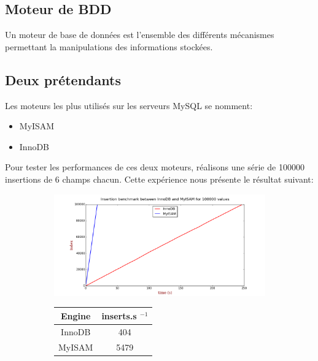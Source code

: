 \subsection*{Moteur de BDD}
Un moteur de base de données est l'ensemble des différents mécanismes permettant la manipulations des informations stockées. 

\subsection*{Deux prétendants}

Les moteurs les plus utilisés sur les serveurs MySQL se nomment:

\begin{itemize}
	\item{MyISAM} 
	\item{InnoDB} 
\end{itemize}

Pour tester les performances de ces deux moteurs, réalisons une série de 100000 insertions de 6 champs chacun. Cette expérience nous présente le résultat suivant:
  
\begin{figure}[h]
	\centering
	\begin{subfigure}[b]{0.6\textwidth}
		\includegraphics[width=\textwidth]{images/benchmark_inno_isam_100000.png}
	\end{subfigure}
	\begin{subfigure}[b]{0.3\textwidth}
		\begin{tabular}{|c|c|}
		\hline Engine & inserts.s $^{-1}$ \\ 
		\hline InnoDB & 404 \\ 
		\hline MyISAM & 5479 \\ 
		\hline 
		\end{tabular} 
	\end{subfigure}
\end{figure}

